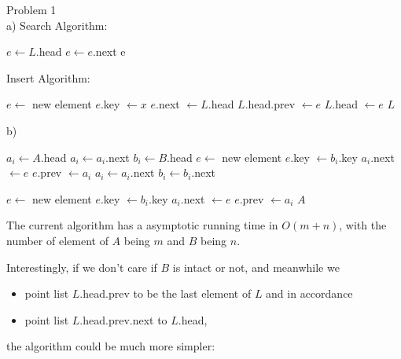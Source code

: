 \documentclass{article}
\begin{document}
Problem 1\\

a)
Search Algorithm:
\begin{algorithmic}[1]
    \State $e \gets L$.head
        \State $e \gets e$.next
    \EndWhile
    \State \Return e
\EndFunction
\end{algorithmic}

Insert Algorithm:
\begin{algorithmic}[1]
        \State $e \gets$ new element
        \State $e$.key $\gets x$
        \State $e$.next $\gets L$.head
            \State $L$.head.prev $\gets e$
        \EndIf
        \State $L$.head $\gets e$
        \State \Return $L$
    \EndFunction
\end{algorithmic}

b)
\begin{algorithmic}[1]
        \State $a_i \gets A$.head
        \State $a_i \gets a_i$.next
        \EndWhile
        \State $b_i \gets B$.head
            \State $e \gets$ new element
            \State $e$.key $\gets b_i$.key
            \State $a_i$.next $\gets e$
            \State $e$.prev $\gets a_i$
            \State $a_i \gets a_i.$next
            \State $b_i \gets b_i$.next
        \EndWhile

        \State $e \gets$ new element
        \State $e$.key $\gets b_i$.key
        \State $a_i$.next $\gets e$
        \State $e$.prev $\gets a_i$
        \State \Return $A$
    \EndFunction
\end{algorithmic}

The current algorithm has a asymptotic running time in $O(m + n)$, with the
number of element of $A$ being $m$ and $B$ being $n$.

Interestingly, if we don't care if $B$ is intact or not, and meanwhile we
\begin{itemize}
    \item point list $L$.head.prev to be the last element of $L$ and in accordance
    \item point list $L$.head.prev.next to $L$.head,
\end{itemize}
the algorithm could be much more simpler:
\end{document}
